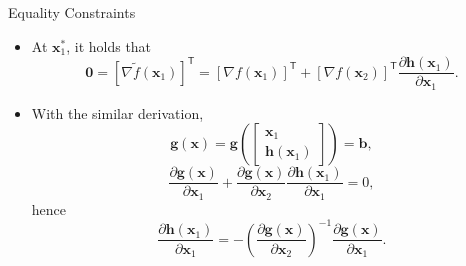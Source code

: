 \documentclass[aspectratio=169,hyperref,UTF8,CJK]{beamer}
\newcommand{\trans}{\mathsf{T}}
\newcommand{\vect}[1]{\boldsymbol{#1}}
\begin{document}
\begin{frame}{Equality Constraints}
  \small
  \begin{itemize}
    \item At $\vect{x}_1^{*}$, it holds that
      \begin{equation}\tag{14}
        \vect{0}=[\nabla\widetilde f(\vect{x}_1)]^{\trans}
        =[\nabla f(\vect{x}_1)]^{\trans}+
        [\nabla f(\vect{x}_2)]^{\trans}
        \frac{\partial\vect{h}(\vect{x}_1)}{\partial\vect{x}_1}.
      \end{equation}
    \item With the similar derivation,
      \begin{equation*}
        \vect{g}(\vect{x})=\vect{g}\left(\begin{bmatrix}\vect{x}_1\\\vect{h}(\vect{x}_1)\end{bmatrix}\right)=\vect{b},
      \end{equation*}
      \begin{equation*}
        \frac{\partial\vect{g}(\vect{x})}{\partial\vect{x}_1}+
        \frac{\partial\vect{g}(\vect{x})}{\partial\vect{x}_2}
        \frac{\partial\vect{h}(\vect{x}_1)}{\partial\vect{x}_1}=0,
      \end{equation*}
      hence
      \begin{equation}\tag{15}
        \frac{\partial\vect{h}(\vect{x}_1)}{\partial\vect{x}_1}
        =-\left(\frac{\partial\vect{g}(\vect{x})}{\partial\vect{x}_2}\right)^{-1}
        \frac{\partial\vect{g}(\vect{x})}{\partial\vect{x}_1}.
      \end{equation}
  \end{itemize}
\end{frame}
\end{document}
